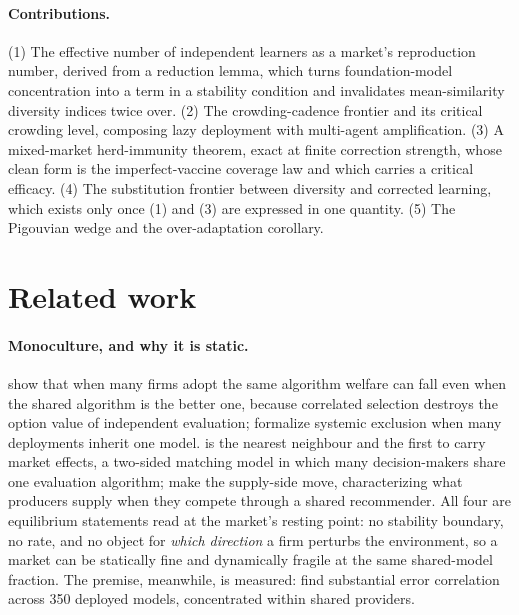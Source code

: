 \documentclass{article}
\theoremstyle{plain}
\theoremstyle{definition}
\begin{document}
\paragraph{Contributions.}
(1) The effective number of independent learners as a market's reproduction number, derived from a reduction lemma, which turns foundation-model concentration into a term in a stability condition and invalidates mean-similarity diversity indices twice over. (2) The crowding-cadence frontier and its critical crowding level, composing lazy deployment with multi-agent amplification. (3) A mixed-market herd-immunity theorem, exact at finite correction strength, whose clean form is the imperfect-vaccine coverage law and which carries a critical efficacy. (4) The substitution frontier between diversity and corrected learning, which exists only once (1) and (3) are expressed in one quantity. (5) The Pigouvian wedge and the over-adaptation corollary.

\section{Related work}

\paragraph{Monoculture, and why it is static.}
\citet{kleinberg2021} show that when many firms adopt the same algorithm welfare can fall even when the shared algorithm is the better one, because correlated selection destroys the option value of independent evaluation; \citet{bommasani2022} formalize systemic exclusion when many deployments inherit one model. \citet{peng2024} is the nearest neighbour and the first to carry market effects, a two-sided matching model in which many decision-makers share one evaluation algorithm; \citet{jagadeesan2023} make the supply-side move, characterizing what producers supply when they compete through a shared recommender. All four are equilibrium statements read at the market's resting point: no stability boundary, no rate, and no object for \emph{which direction} a firm perturbs the environment, so a market can be statically fine and dynamically fragile at the same shared-model fraction. The premise, meanwhile, is measured: \citet{kim2025} find substantial error correlation across 350 deployed models, concentrated within shared providers.
\end{document}
